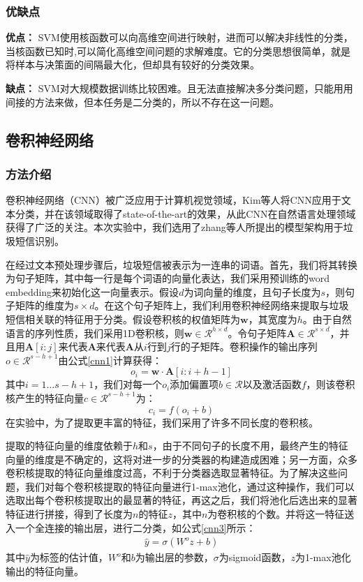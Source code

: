 \documentclass[a4paper]{article}
\begin{document}
\subsubsection{优缺点}
\textbf{优点：}
SVM使用核函数可以向高维空间进行映射，进而可以解决非线性的分类，当核函数已知时,可以简化高维空间问题的求解难度。它的分类思想很简单，就是将样本与决策面的间隔最大化，但却具有较好的分类效果。

\textbf{缺点：}
SVM对大规模数据训练比较困难。且无法直接解决多分类问题，只能用用间接的方法来做，但本任务是二分类的，所以不存在这一问题。

\subsection{卷积神经网络}
\subsubsection{方法介绍}
卷积神经网络（CNN）被广泛应用于计算机视觉领域，Kim等人\cite{kim2014convolutional}将CNN应用于文本分类，并在该领域取得了state-of-the-art的效果，从此CNN在自然语言处理领域获得了广泛的关注。本次实验中，我们选用了zhang等人\cite{zhang2015sensitivity}所提出的模型架构用于垃圾短信识别。

在经过文本预处理步骤后，垃圾短信被表示为一连串的词语。首先，我们将其转换为句子矩阵，其中每一行是每个词语的向量化表达，我们采用预训练的word embedding来初始化这一向量表示。假设$d$为词向量的维度，且句子长度为$s$，则句子矩阵的维度为$s \times d$。在这个句子矩阵上，我们利用卷积神经网络来提取与垃圾短信相关联的特征用于分类。假设卷积核的权值矩阵为$\mathbf{w}$，其宽度为$h$。由于自然语言的序列性质，我们采用1D卷积核，则$\mathbf{w} \in \mathcal{R}^{h \times d}$。令句子矩阵$\mathbf{A} \in \mathcal{R}^{s \times d}$，并且用$\mathbf{A}[i:j]$来代表$\mathbf{A}$来代表$\mathbf{A}$从$i$行到$j$行的子矩阵。卷积操作的输出序列$o \in \mathcal{R}^{s-h+1}$由公式\eqref{cnn1}计算获得：
\begin{equation}\label{cnn1}
    o_i = \mathbf{w} \cdot \mathbf{A}[i:i+h-1]
\end{equation}
其中$i = 1 ... s-h+1$，我们对每一个$o_i$添加偏置项$b\in\mathcal{R}$以及激活函数$f$，则该卷积核产生的特征向量$c\in \mathcal{R}^{s-h+1}$为：
\begin{equation}\label{cnn2}
    c_i = f(o_i + b)
\end{equation}
在实验中，为了提取更丰富的特征，我们采用了许多不同长度的卷积核。

提取的特征向量的维度依赖于$h$和$s$，由于不同句子的长度不用，最终产生的特征向量的维度是不确定的，这将对进一步的分类器的构建造成困难；另一方面，众多卷积核提取的特征向量维度过高，不利于分类器选取显著特征。为了解决这些问题，我们对每个卷积核提取的特征向量进行1-max池化\cite{boureau2010theoretical}，通过这种操作，我们可以选取出每个卷积核提取出的最显著的特征，再这之后，我们将池化后选出来的显著特征进行拼接，得到了长度为$n$的特征$z$，其中$n$为卷积核的个数。并将这一特征送入一个全连接的输出层，进行二分类，如公式\eqref{cnn3}所示：
\begin{align}\label{cnn3}
    \hat{y} = \sigma(W^oz + b)
\end{align}
其中$\hat{y}$为标签的估计值，$W^o$和$b$为输出层的参数，$\sigma$为sigmoid函数，$z$为1-max池化输出的特征向量。
\end{document}
